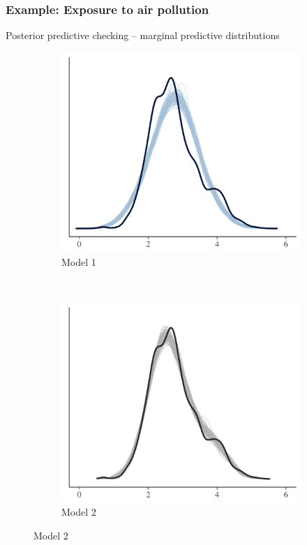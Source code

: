 \documentclass[10pt,handout]{beamer}
\begin{document}
\begin{frame}

\frametitle{Example: Exposure to air pollution}

  Posterior predictive checking -- marginal predictive distributions
\begin{figure}
\centering
\begin{subfigure}{0.48\textwidth}
\includegraphics[width=\textwidth]{figs/ppc_dens1.png}
\caption{Model 1}
\end{subfigure}
~
\begin{subfigure}{0.48\textwidth}
\includegraphics[width=\textwidth]{figs/ppc_dens2.png}
\caption{Model 2}
\end{subfigure}
\end{figure}

\end{frame}
\end{document}
